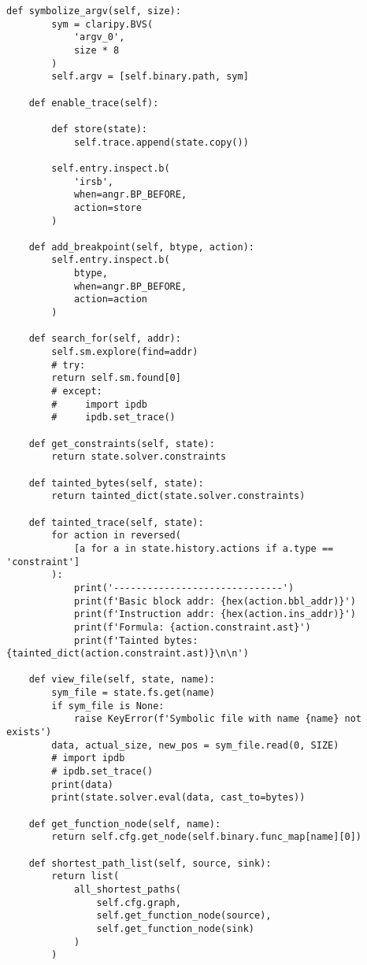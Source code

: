 \begin{lstlisting}[environoment=py_code, caption=taint\_influence.py, captionpos=b]
    def symbolize_argv(self, size):
        sym = claripy.BVS(
            'argv_0',
            size * 8
        )
        self.argv = [self.binary.path, sym]

    def enable_trace(self):

        def store(state):
            self.trace.append(state.copy())

        self.entry.inspect.b(
            'irsb',
            when=angr.BP_BEFORE,
            action=store
        )

    def add_breakpoint(self, btype, action):
        self.entry.inspect.b(
            btype,
            when=angr.BP_BEFORE,
            action=action
        )

    def search_for(self, addr):
        self.sm.explore(find=addr)
        # try:
        return self.sm.found[0]
        # except:
        #     import ipdb
        #     ipdb.set_trace()

    def get_constraints(self, state):
        return state.solver.constraints

    def tainted_bytes(self, state):
        return tainted_dict(state.solver.constraints)

    def tainted_trace(self, state):
        for action in reversed(
            [a for a in state.history.actions if a.type == 'constraint']
        ):
            print('------------------------------')
            print(f'Basic block addr: {hex(action.bbl_addr)}')
            print(f'Instruction addr: {hex(action.ins_addr)}')
            print(f'Formula: {action.constraint.ast}')
            print(f'Tainted bytes: {tainted_dict(action.constraint.ast)}\n\n')

    def view_file(self, state, name):
        sym_file = state.fs.get(name)
        if sym_file is None:
            raise KeyError(f'Symbolic file with name {name} not exists')
        data, actual_size, new_pos = sym_file.read(0, SIZE)
        # import ipdb
        # ipdb.set_trace()
        print(data)
        print(state.solver.eval(data, cast_to=bytes))

    def get_function_node(self, name):
        return self.cfg.get_node(self.binary.func_map[name][0])

    def shortest_path_list(self, source, sink):
        return list(
            all_shortest_paths(
                self.cfg.graph,
                self.get_function_node(source),
                self.get_function_node(sink)
            )
        )




\end{lstlisting}
